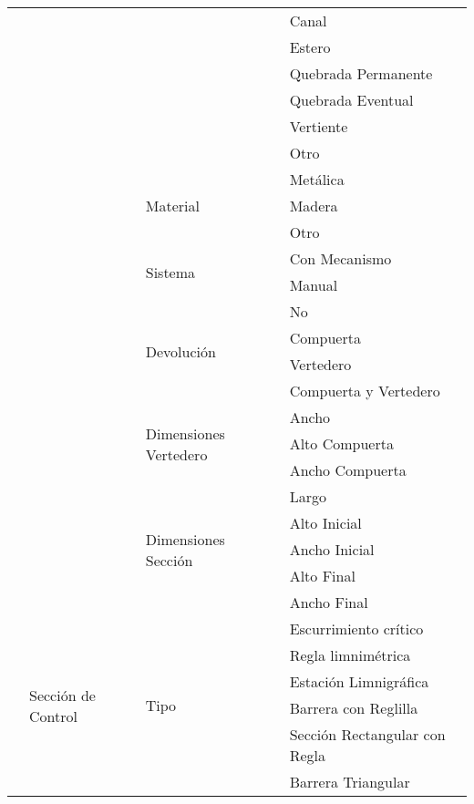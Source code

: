 \documentclass[]{article}
\begin{document}
\begin{longtable}[H]{|p{3cm}|p{3.5cm}|p{3.5cm}|p{3.5cm}|}
    \cline{4-4}
    & & & Canal\\
    \cline{4-4}
    & & & Estero\\
    \cline{4-4}
    & & & Quebrada Permanente\\
    \cline{4-4}
    & & & Quebrada Eventual\\
    \cline{4-4}
    & & & Vertiente\\
    \cline{4-4}
    & & & Otro\\
    \cline{3-4}
    & & \multirow {3}{3.5cm}{Material} & Metálica\\
    \cline{4-4}
    & & & Madera\\
    \cline{4-4}
    & & & Otro\\
    \cline{3-4}
    & & \multirow {2}{3.5cm}{Sistema} & Con Mecanismo\\
    \cline{4-4}
    & & & Manual\\
    \cline{3-4}
    & & \multirow {4}{3.5cm}{Devolución} & No\\
    \cline{4-4}
    & & & Compuerta\\
    \cline{4-4}
    & & & Vertedero\\
    \cline{4-4}
    & & & Compuerta y Vertedero\\
    \cline{3-4}
    & & \multirow {3}{3.5cm}{Dimensiones Vertedero} & Ancho\\
    \cline{4-4}
    & & & Alto Compuerta\\
    \cline{4-4}
    & & & Ancho Compuerta\\
    \cline{3-4}
    & & \multirow {5}{3.5cm}{Dimensiones Sección} & Largo\\
    \cline{4-4}
    & & & Alto Inicial\\
    \cline{4-4}
    & & & Ancho Inicial\\
    \cline{4-4}
    & & & Alto Final\\
    \cline{4-4}
    & & & Ancho Final\\
    \cline{2-4} \pagebreak  
    & \multirow {17}{3.5cm}{Sección de Control} & \multirow {11}{3.5cm}{Tipo} &  Escurrimiento crítico\\
    \cline{4-4}
    & & & Regla limnimétrica\\
    \cline{4-4}
    & & & Estación Limnigráfica\\
    \cline{4-4}
    & & & Barrera con Reglilla\\
    \cline{4-4}
    & & & Sección Rectangular con Regla\\
    \cline{4-4}
    & & & Barrera Triangular\\

\end{longtable}
\end{document}
